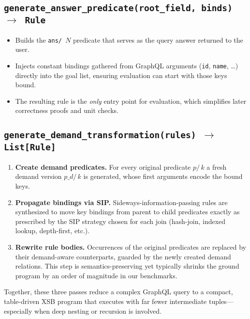 \documentclass[11pt]{article}
\begin{document}
\subsection{\texttt{generate\_answer\_predicate(root\_field, binds) $\rightarrow$ Rule}}
\begin{itemize}[leftmargin=1.5em]
  \item Builds the \texttt{ans/\,$N$} predicate that serves as the query
        answer returned to the user.
  \item Injects constant bindings gathered from GraphQL arguments
        (\texttt{id}, \texttt{name}, \ldots) directly into the goal list,
        ensuring evaluation can start with those keys bound.
  \item The resulting rule is the \emph{only} entry point for evaluation,
        which simplifies later correctness proofs and unit checks.
\end{itemize}

\subsection{\texttt{generate\_demand\_transformation(rules) $\rightarrow$ List\texttt{[}Rule\texttt{]}}}
\begin{enumerate}[label=\arabic*., leftmargin=1.6em]
  \item \textbf{Create demand predicates.}  
        For every original predicate \(p/\,k\) a fresh demand version
        \(p\_d/\,k\) is generated, whose first arguments encode the bound
        keys.
  \item \textbf{Propagate bindings via SIP.}  
        Sideways-information-passing rules are synthesized to move key
        bindings from parent to child predicates exactly as prescribed by
        the SIP strategy chosen for each join (hash-join, indexed
        lookup, depth-first, etc.).
  \item \textbf{Rewrite rule bodies.}  
        Occurrences of the original predicates are replaced by their
        demand-aware counterparts, guarded by the newly created demand
        relations.  This step is semantics-preserving \cite{DemandTransform}
        yet typically shrinks the ground program by an order of
        magnitude in our benchmarks.
\end{enumerate}

Together, these three passes reduce a complex GraphQL query to a compact,
table-driven XSB program that executes with far fewer intermediate
tuples—especially when deep nesting or recursion is involved.
\end{document}
